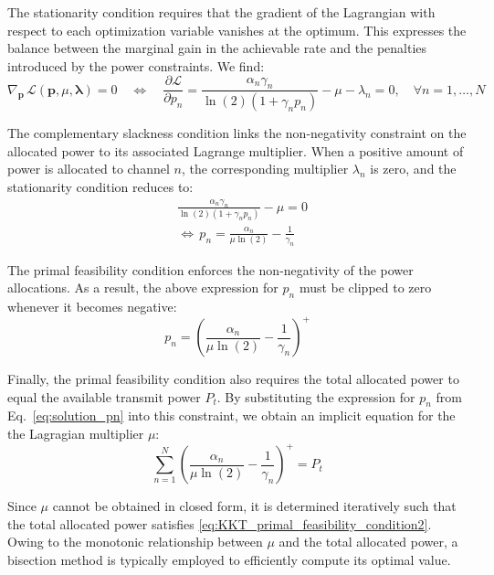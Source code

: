The stationarity condition requires that the gradient of the Lagrangian with respect to each optimization variable vanishes at the optimum. This expresses the balance between the marginal gain in the achievable rate and the penalties introduced by the power constraints. We find:
\begin{equation}
\label{eq:KKT_stationarity_condition}
    \nabla_{\mathbf{p}} \, \mathcal{L}(\mathbf{p}, \mu, \boldsymbol{\lambda}) = 0
    \quad \iff \quad
    \frac{\partial \mathcal{L}}{\partial p_n} = \frac{\alpha_n \gamma_n}{\ln(2) \left( 1 + \gamma_n p_n \right)} - \mu - \lambda_n = 0, \quad \forall n = 1, \dots, N
\end{equation}

The complementary slackness condition links the non-negativity constraint on the allocated power to its associated Lagrange multiplier. When a positive amount of power is allocated to channel $n$, the corresponding multiplier $\lambda_n$ is zero, and the stationarity condition reduces to:
\begin{subequations}
\label{eq:KKT_complementary_slackness_condition}
\begin{align}
    & \frac{\alpha_n \gamma_n}{\ln(2) (1 + \gamma_n p_n)} - \mu = 0 \\
    & \iff \, p_n = \frac{\alpha_n}{\mu \ln(2)} - \frac{1}{\gamma_n}
\end{align}
\end{subequations}

The primal feasibility condition enforces the non-negativity of the power allocations. As a result, the above expression for $p_n$ must be clipped to zero whenever it becomes negative:
\begin{equation}
\label{eq:KKT_primal_feasibility_condition1}
    p_n = \left( \frac{\alpha_n}{\mu \ln(2)} - \frac{1}{\gamma_n} \right)^{+}
\end{equation}

Finally, the primal feasibility condition also requires the total allocated power to equal the available transmit power $P_t$. By substituting the expression for $p_n$ from Eq.~\eqref{eq:solution_pn} into this constraint, we obtain an implicit equation for the the Lagragian multiplier $\mu$:
\begin{equation}
\label{eq:KKT_primal_feasibility_condition2}
    \sum_{n=1}^{N} \left( \frac{\alpha_n}{\mu \ln(2)} - \frac{1}{\gamma_n} \right)^{+} = P_t
\end{equation}

Since $\mu$ cannot be obtained in closed form, it is determined iteratively such that the total allocated power satisfies \eqref{eq:KKT_primal_feasibility_condition2}. Owing to the monotonic relationship between $\mu$ and the total allocated power, a bisection method is typically employed to efficiently compute its optimal value.


